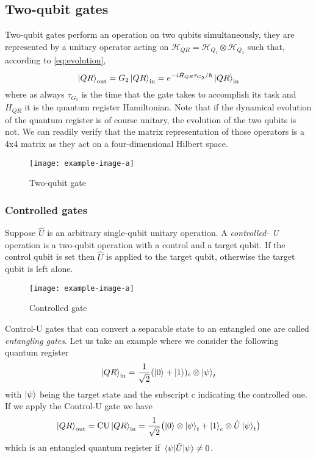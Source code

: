 \subsection{Two-qubit gates}
Two-qubit gates perform an operation on two qubits simultaneously, they are represented by a unitary operator acting on $\mathcal{H}_{QR} = \mathcal{H}_{Q_1} \otimes \mathcal{H}_{Q_2}$ such that, according to \eqref{eq:evolution},
\begin{equation*}
   \ket{QR}_\textup{out} = G_2\ket{QR}_\textup{in} = e^{-i\hat{H}_{QR} \tau_{G_2}/\hbar}\ket{QR}_\textup{in}
\end{equation*}
where as always $\tau_{G_2}$ is the time that the gate takes to accomplish its task and $H_{QR}$ it is the quantum register Hamiltonian. Note that if the dynamical evolution of the quantum register is of course unitary, the evolution of the two qubits is not.
We can readily verify that the matrix representation of those operators is a 4x4 matrix as they act on a four-dimensional Hilbert space.
\begin{figure}[htb]
\centering
\texttt{[image: example-image-a]}
\caption{Two-qubit gate}
\label{fig:two-qubit-gate}
\end{figure}
\subsubsection{Controlled gates}
Suppose $\hat{U}$ is an arbitrary single-qubit unitary operation. A \emph{controlled-
U} operation is a two-qubit operation with a control and a target qubit. If the control
qubit is set then $\hat{U}$ is applied to the target qubit, otherwise the target qubit is left alone.
\begin{figure}[htb]
\centering
\texttt{[image: example-image-a]}
\caption{Controlled gate}
\label{fig:controlled-u}
\end{figure}

Control-U gates that can convert a separable state to an entangled one are called \emph{entangling gates}. Let us take an example where we consider the following quantum register
\begin{equation*}
    \ket{QR}_\textup{in} = \frac{1}{\sqrt2} (\ket{0} + \ket{1})_c \otimes \ket{\psi}_t
\end{equation*}
with $\ket{\psi}$ being the target state and the subscript c indicating the controlled one.
If we apply the Control-U gate we have
\begin{equation}
     \ket{QR}_\textup{out} =\text{CU} \ket{QR}_\textup{in} =  \frac{1}{\sqrt2} \bigl(\ket{0} \otimes \ket{\psi}_t + \ket{1}_c \otimes \hat{U}\ket{\psi}_t\bigr)
\end{equation}
which is an entangled quantum register if $\expval{\hat{U}}{\psi} \neq 0$.

